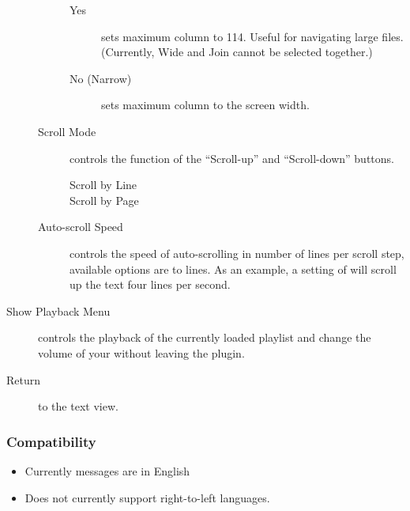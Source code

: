 \begin{description}
\begin{description}
\begin{description}
            \item[Yes] sets maximum column to 114. Useful for navigating large files.
            (Currently, Wide and Join cannot be selected together.)
            \item[No (Narrow)] sets maximum column to the screen width.
        \end{description}
    \item[Scroll Mode] controls the function of the ``Scroll-up'' and
    ``Scroll-down'' buttons.
        \begin{description}
            \item[Scroll by Line]
            \item[Scroll by Page]
        \end{description}
    \item[Auto-scroll Speed]
    controls the speed of auto-scrolling in number of lines per scroll step,
    available options are  to  lines. As an example,
    a setting of  will scroll up the text four lines per second.
    \end{description}

\item[Show Playback Menu] controls the playback of the currently loaded playlist
and change the volume of your \dap without leaving the plugin.
\item[Return] to the text view.
\end{description}


\subsubsection{Compatibility}

\begin{itemize}
\item Currently messages are in English
\item Does not currently support right{}-to{}-left languages.
\end{itemize}
